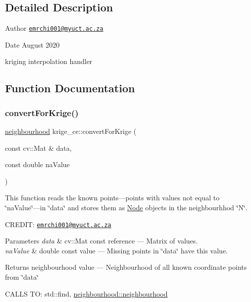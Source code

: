 \subsection{Detailed Description}
\begin{DoxyAuthor}{Author}
\href{mailto:emrchi001@myuct.ac.za}{\tt emrchi001@myuct.\+ac.\+za} 
\end{DoxyAuthor}
\begin{DoxyDate}{Date}
August 2020
\end{DoxyDate}
kriging interpolation handler 

\subsection{Function Documentation}
\mbox{\label{namespacekrige__ce_a861d4c1c299c2a804f97da659a07da9b}} 
\subsubsection{\texorpdfstring{convert\+For\+Krige()}{convertForKrige()}}
{\footnotesize\ttfamily \hyperlink{classkrige__ce_1_1neighbourhood}{neighbourhood} krige\+\_\+ce\+::convert\+For\+Krige (\begin{DoxyParamCaption}\item[{const cv\+::\+Mat \&}]{data,  }\item[{const double}]{na\+Value }\end{DoxyParamCaption})}



This function reads the known points---points with values not equal to \char`\"{}na\+Value\char`\"{}---in \char`\"{}data\char`\"{} and stores them as \hyperlink{classkrige__ce_1_1Node}{Node} objects in the neighbourhhod \char`\"{}\+N\char`\"{}. 

C\+R\+E\+D\+IT\+: \href{mailto:emrchi001@myuct.ac.za}{\tt emrchi001@myuct.\+ac.\+za}


\begin{DoxyParams}{Parameters}
{\em data} & cv\+::\+Mat const reference --- Matrix of values. \\
\hline
{\em na\+Value} & double const value --- Missing points in \char`\"{}data\char`\"{} have this value.\\
\hline
\end{DoxyParams}
\begin{DoxyReturn}{Returns}
neighbourhood value --- Neighbourhood of all known coordinate points from \char`\"{}data\char`\"{}
\end{DoxyReturn}
C\+A\+L\+LS TO\+: std\+::find, \hyperlink{}{neighbourhood\+::neighbourhood}

